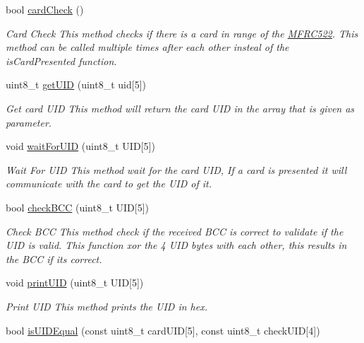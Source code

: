 \begin{DoxyCompactItemize}
\mbox{\label{classMFRC522_ae9cfc4503cd73fcc900554b7f2fab263}} 
bool \hyperlink{classMFRC522_ae9cfc4503cd73fcc900554b7f2fab263}{card\+Check} ()
\begin{DoxyCompactList}\small\item\em Card Check  This method checks if there is a card in range of the \hyperlink{classMFRC522}{M\+F\+R\+C522}. This method can be called multiple times after each other insteal of the is\+Card\+Presented function. \end{DoxyCompactList}\item 
uint8\+\_\+t \hyperlink{classMFRC522_af40b5faa180cbcd5a41ef31d41a2332e}{get\+U\+ID} (uint8\+\_\+t uid\mbox{[}5\mbox{]})
\begin{DoxyCompactList}\small\item\em Get card U\+ID  This method will return the card U\+ID in the array that is given as parameter. \end{DoxyCompactList}\item 
void \hyperlink{classMFRC522_a160ec18695ac578905ad9bcd033e1514}{wait\+For\+U\+ID} (uint8\+\_\+t U\+ID\mbox{[}5\mbox{]})
\begin{DoxyCompactList}\small\item\em Wait For U\+ID  This method wait for the card U\+ID, If a card is presented it will communicate with the card to get the U\+ID of it. \end{DoxyCompactList}\item 
bool \hyperlink{classMFRC522_a05f0135bd98472284a996a71b74eaa3d}{check\+B\+CC} (uint8\+\_\+t U\+ID\mbox{[}5\mbox{]})
\begin{DoxyCompactList}\small\item\em Check B\+CC  This method check if the received B\+CC is correct to validate if the U\+ID is valid. This function xor the 4 U\+ID bytes with each other, this results in the B\+CC if its correct. \end{DoxyCompactList}\item 
void \hyperlink{classMFRC522_af640b9f28937dc630a7482fc2aaf505f}{print\+U\+ID} (uint8\+\_\+t U\+ID\mbox{[}5\mbox{]})
\begin{DoxyCompactList}\small\item\em Print U\+ID  This method prints the U\+ID in hex. \end{DoxyCompactList}\item 
bool \hyperlink{classMFRC522_a9d4c7050d285c1fd45cc088d1cb53093}{is\+U\+I\+D\+Equal} (const uint8\+\_\+t card\+U\+ID\mbox{[}5\mbox{]}, const uint8\+\_\+t check\+U\+ID\mbox{[}4\mbox{]})

\end{DoxyCompactItemize}
